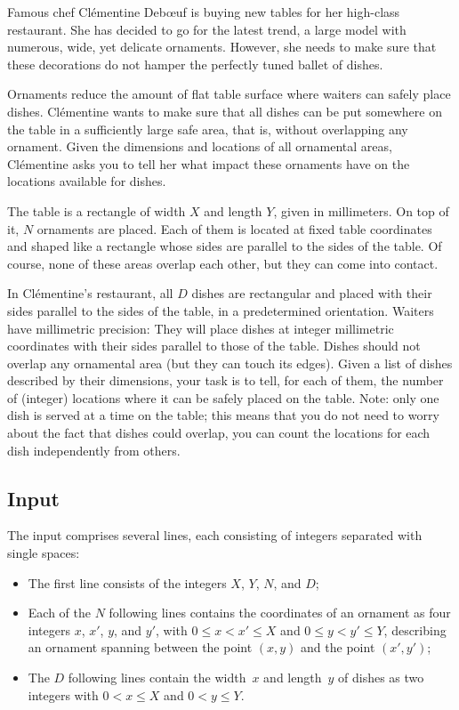 
\noindent
Famous chef Clémentine Deb\oe uf is buying new tables for her
high-class restaurant. She has decided to go for the latest trend, a
large model with numerous, wide, yet delicate ornaments. However, she
needs to make sure that these decorations do not hamper the perfectly
tuned ballet of dishes.

Ornaments reduce the amount of flat table surface where waiters can
safely place dishes. Clémentine wants to make sure that all dishes can
be put somewhere on the table in a sufficiently large safe area, that
is, without overlapping any ornament. Given the dimensions and
locations of all ornamental areas, Clémentine asks you to
tell her what impact these ornaments have on the locations
available for dishes.

The table is a rectangle of width $X$ and length $Y$, given in
millimeters. On top of it, $N$ ornaments are placed.  Each of them is
located at fixed table coordinates and shaped like a rectangle whose
sides are parallel to the sides of the table. Of course, none of these
areas overlap each other, but they can come into contact.

In Clémentine's restaurant, all $D$ dishes are rectangular and placed
with their sides parallel to the sides of the table, in a
predetermined orientation. Waiters have millimetric precision: They
will place dishes at integer millimetric coordinates with their sides
parallel to those of the table. Dishes should not overlap any
ornamental area (but they can touch its edges). Given a list of dishes
described by their dimensions, your task is to tell, for each of them,
the number of (integer) locations where it can be safely placed on the
table. Note: only one dish is served at a time on the table; this
means that you do not need to worry about the fact that dishes could
overlap, you can count the locations for each dish independently from
others.

\subsection*{Input}
The input comprises several lines, each consisting of integers separated
with single spaces:
\begin{itemize}
\item The first line consists of the integers $X$, $Y$, $N$, and $D$;

\item Each of the $N$ following lines contains the coordinates of an
  ornament as four integers $x$, $x'$, $y$, and $y'$, with $0 \leq x <
  x' \leq X$ and $0 \leq y < y' \leq Y$, describing an ornament
  spanning between the point $(x,y)$ and the point $(x',y')$;

\item The $D$ following lines contain the width~$x$ and length~$y$ of
  dishes as two integers with $0 < x \leq
  X$ and $0 < y \leq Y$.
\end{itemize}

